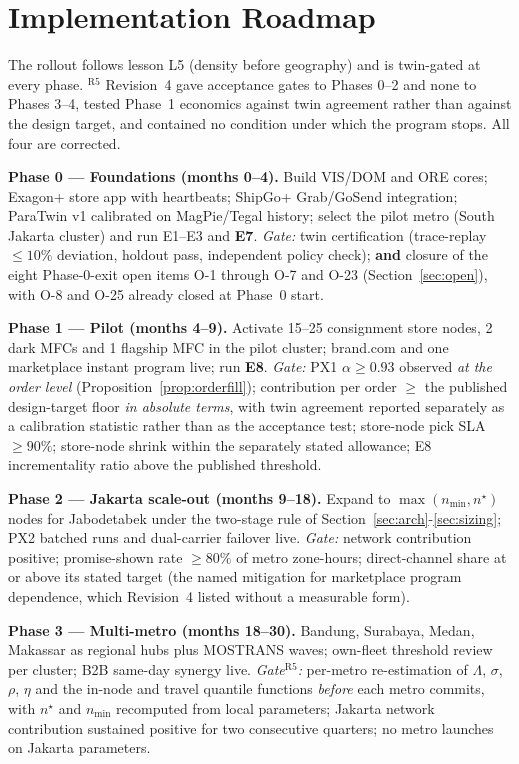 \section{Implementation Roadmap}\label{sec:roadmap}

The rollout follows lesson L5 (density before geography) and is twin-gated at every phase. $^{\mathrm{R5}}$ Revision~4 gave acceptance gates to Phases 0--2 and none to Phases 3--4, tested Phase~1 economics against twin agreement rather than against the design target, and contained no condition under which the program stops. All four are corrected.

\textbf{Phase 0 --- Foundations (months 0--4).} Build VIS/DOM and ORE cores; Exagon+ store app with heartbeats; ShipGo+ Grab/GoSend integration; ParaTwin v1 calibrated on MagPie/Tegal history; select the pilot metro (South Jakarta cluster) and run E1--E3 and \textbf{E7}.
\emph{Gate:} twin certification (trace-replay $\le10\%$ deviation, holdout pass, independent policy check); \textbf{and} closure of the eight Phase-0-exit open items O-1 through O-7 and O-23 (Section~\ref{sec:open}), with O-8 and O-25 already closed at Phase~0 start.

\textbf{Phase 1 --- Pilot (months 4--9).} Activate 15--25 consignment store nodes, 2 dark MFCs and 1 flagship MFC in the pilot cluster; brand.com and one marketplace instant program live; run \textbf{E8}.
\emph{Gate:} PX1 $\alpha\ge0.93$ observed \emph{at the order level} (Proposition~\ref{prop:orderfill}); contribution per order $\ge$ the published design-target floor \emph{in absolute terms}, with twin agreement reported separately as a calibration statistic rather than as the acceptance test; store-node pick SLA $\ge90\%$; store-node shrink within the separately stated allowance; E8 incrementality ratio above the published threshold.

\textbf{Phase 2 --- Jakarta scale-out (months 9--18).} Expand to $\max(n_{\min},n^\star)$ nodes for Jabodetabek under the two-stage rule of Section~\ref{sec:arch}-\ref{sec:sizing}; PX2 batched runs and dual-carrier failover live.
\emph{Gate:} network contribution positive; promise-shown rate $\ge80\%$ of metro zone-hours; direct-channel share at or above its stated target (the named mitigation for marketplace program dependence, which Revision~4 listed without a measurable form).

\textbf{Phase 3 --- Multi-metro (months 18--30).} Bandung, Surabaya, Medan, Makassar as regional hubs plus MOSTRANS waves; own-fleet threshold review per cluster; B2B same-day synergy live.
\emph{Gate}$^{\mathrm{R5}}$\emph{:} per-metro re-estimation of $\Lambda$, $\sigma$, $\rho$, $\eta$ and the in-node and travel quantile functions \emph{before} each metro commits, with $n^\star$ and $n_{\min}$ recomputed from local parameters; Jakarta network contribution sustained positive for two consecutive quarters; no metro launches on Jakarta parameters.

